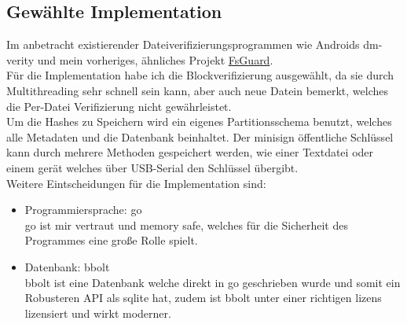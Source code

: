 \subsection{Gewählte Implementation}
Im anbetracht existierender Dateiverifizierungsprogrammen wie Androids dm-verity und mein vorheriges, ähnliches Projekt \href{https://github.com/linux-immutability-tools/FsGuard}{FsGuard}.
\\
Für die Implementation habe ich die Blockverifizierung ausgewählt, da sie durch Multithreading sehr schnell sein kann, aber auch neue Datein bemerkt, welches die Per-Datei Verifizierung nicht gewährleistet.
\\
Um die Hashes zu Speichern wird ein eigenes Partitionsschema benutzt, welches alle Metadaten und die Datenbank beinhaltet. Der minisign öffentliche Schlüssel kann durch mehrere Methoden gespeichert werden, wie einer Textdatei oder einem gerät welches über USB-Serial den Schlüssel übergibt.
\\
Weitere Eintscheidungen für die Implementation sind:
\begin{itemize}
\item Programmiersprache: go\\
  go ist mir vertraut und memory safe, welches für die Sicherheit des Programmes eine große Rolle spielt.
\item Datenbank: bbolt\\
  bbolt ist eine Datenbank welche direkt in go geschrieben wurde und somit ein Robusteren API als sqlite hat, zudem ist bbolt unter einer richtigen lizens lizensiert und wirkt moderner.
\end{itemize}
  
